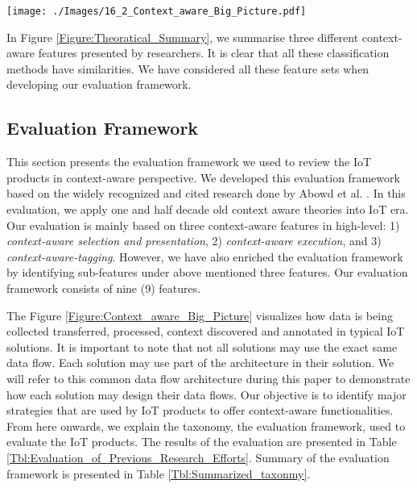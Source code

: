 \documentclass[journal]{IEEEtran}
\begin{document}
 
   \begin{figure*}[!t]
    \centering
\texttt{[image: ./Images/16\_2\_Context\_aware\_Big\_Picture.pdf]}
   \vspace{-0.33cm}	
    \caption{Data Flow in IoT Solutions in High-level. Context can be discovers in different stages / phases in the data flow. A typical IoT solution may use some part of the data flow architecture depending on the their intended functionalities.}
    \label{Figure:Context_aware_Big_Picture}	
   \vspace{-0.4cm}	
   \end{figure*}
  
 
 
 

 


 
  In Figure \ref{Figure:Theoratical_Summary}, we summarise three different context-aware features presented by  researchers. It is clear that all these classification methods have similarities. We have considered all these feature sets when developing our evaluation framework.
 
 
 
  \subsection{Evaluation Framework}
 
 
This section presents the evaluation framework we used to review the IoT products in context-aware perspective. We developed this evaluation framework based on the widely recognized and cited research done by Abowd et al. \cite{P104}.  In this evaluation, we apply one and half decade old context aware theories into IoT era. Our evaluation is mainly based on three context-aware features in high-level: 1)\textit{ context-aware selection and presentation}, 2) \textit{context-aware execution}, and 3) \textit{context-aware-tagging}.  However, we have also enriched the evaluation framework by identifying sub-features under above mentioned three features. Our evaluation framework consists of nine (9) features.


 



The  Figure \ref{Figure:Context_aware_Big_Picture} visualizes how data is being collected transferred, processed, context  discovered and annotated in typical IoT solutions. It is important to note that not all solutions may use the exact same data flow. Each solution may use part of the architecture in their solution. We will refer to this common data flow architecture during this paper to demonstrate how each solution may design their data flows. Our objective is to identify major strategies that are used by IoT products to offer context-aware functionalities. From here onwards, we explain the taxonomy, the evaluation framework, used to evaluate the IoT products. The results of the evaluation are presented in Table \ref{Tbl:Evaluation_of_Previous_Research_Efforts}. Summary of the evaluation framework is presented in Table \ref{Tbl:Summarized_taxonmy}.
 
\end{document}
